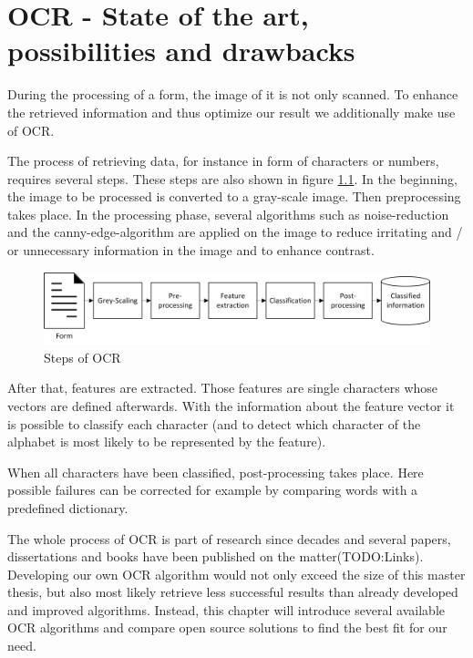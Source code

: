 %
% 
\chapter{OCR - State of the art, possibilities and drawbacks}
\label{cha3}

During the processing of a form, the image of it is not only scanned. To enhance the retrieved information and thus optimize our result we additionally make use of OCR.%

The process of retrieving data, for instance in form of characters or numbers, requires several steps. These steps are also shown in figure \ref{ocrSteps}. In the beginning, the image to be processed is converted to a gray-scale image. Then preprocessing takes place. In the processing phase, several algorithms such as noise-reduction and the canny-edge-algorithm are applied on the image to reduce irritating and / or unnecessary information in the image and to enhance contrast.

\begin{figure}[htbp!]
\centering
\includegraphics[scale=0.9]{Images/OCR/Steps_Of_OCR.png}
\caption{Steps of OCR \label{ocrSteps}}
\end{figure}

After that, features are extracted. Those features are single characters whose vectors are defined afterwards. With the information about the feature vector it is possible to classify each character (and to detect which character of the alphabet is most likely to be represented by the feature).

When all characters have been classified, post-processing takes place. Here possible failures can be corrected for example by comparing words with a predefined dictionary.

The whole process of OCR is part of research since decades and several papers, dissertations and books have been published on the matter(TODO:Links). Developing our own OCR algorithm would not only exceed the size of this master thesis, but also most likely retrieve less successful results than already developed and improved algorithms. Instead, this chapter will introduce several available OCR algorithms and compare open source solutions to find the best fit for our need.

